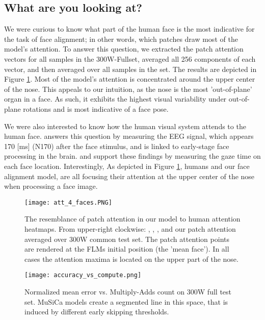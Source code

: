 \documentclass[twocolumn]{article}
\begin{document}
\subsection{What are you looking at?}
We were curious to know what part of the human face is the most indicative for the task of face alignment; in other words, which patches draw most of the model's attention. To answer this question, we extracted the patch attention vectors for all samples in the 300W-Fullset, averaged all 256 components of each vector, and then averaged over all samples in the set. The results are depicted in Figure \ref{fig:path_attention}. Most of the model's attention is concentrated around the upper center of the nose. This appeals to our intuition, as the nose is the most 'out-of-plane' organ in a face. As such, it exhibits the highest visual variability under out-of-plane rotations and is most indicative of a face pose.

We were also interested to know how the human visual system attends to the human face. \cite{zerouali2013optimal} answers this question by measuring the EEG signal, which appears 170 [ms] (N170) after the face stimulus, and is linked to early-stage face processing in the brain. \cite{bindemann2009viewpoint} and \cite{saether2009anchoring} support these findings by measuring the gaze time on each face location. %
Interestingly, As depicted in Figure \ref{fig:path_attention}, humans and our face alignment model, are all focusing their attention at the upper center of the nose when processing a face image. 

\begin{figure}
\texttt{[image: att\_4\_faces.PNG]}
\caption{The resemblance of patch attention in our model to human attention heatmaps. From upper-right clockwise: \cite{saether2009anchoring}, \cite{bindemann2009viewpoint}, \cite{zerouali2013optimal}, and our patch attention averaged over 300W common test set. The patch attention points are rendered at the FLMs initial position (the 'mean face'). In all cases the attention maxima is located on the upper part of the nose.}
\label{fig:path_attention}
\end{figure}





\begin{figure}
\texttt{[image: accuracy\_vs\_compute.png]}
\caption{Normalized mean error vs. Multiply-Adds count on 300W full test set. MuSiCa models create a segmented line in this space, that is induced by different early skipping thresholds. }
\label{fig:accuracy_vs_compute}
\end{figure}
\end{document}
